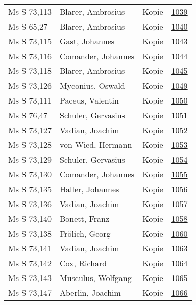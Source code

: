 \documentclass[10pt,a4paper,landscape]{report}
\begin{document}
\begin{longtable}{p{16cm}p{4cm}lr}
Ms S 73,113	&	Blarer, Ambrosius	&	Kopie	&	\href{http://130.60.24.72/assignment/1039}{1039}\\
Ms S 65,27	&	Blarer, Ambrosius	&	Kopie	&	\href{http://130.60.24.72/assignment/1040}{1040}\\
Ms S 73,115	&	Gast, Johannes	&	Kopie	&	\href{http://130.60.24.72/assignment/1043}{1043}\\
Ms S 73,116	&	Comander, Johannes	&	Kopie	&	\href{http://130.60.24.72/assignment/1044}{1044}\\
Ms S 73,118	&	Blarer, Ambrosius	&	Kopie	&	\href{http://130.60.24.72/assignment/1045}{1045}\\
Ms S 73,126	&	Myconius, Oswald	&	Kopie	&	\href{http://130.60.24.72/assignment/1049}{1049}\\
Ms S 73,111	&	Paceus, Valentin	&	Kopie	&	\href{http://130.60.24.72/assignment/1050}{1050}\\
Ms S 76,47	&	Schuler, Gervasius	&	Kopie	&	\href{http://130.60.24.72/assignment/1051}{1051}\\
Ms S 73,127	&	Vadian, Joachim	&	Kopie	&	\href{http://130.60.24.72/assignment/1052}{1052}\\
Ms S 73,128	&	von Wied, Hermann	&	Kopie	&	\href{http://130.60.24.72/assignment/1053}{1053}\\
Ms S 73,129	&	Schuler, Gervasius	&	Kopie	&	\href{http://130.60.24.72/assignment/1054}{1054}\\
Ms S 73,130	&	Comander, Johannes	&	Kopie	&	\href{http://130.60.24.72/assignment/1055}{1055}\\
Ms S 73,135	&	Haller, Johannes	&	Kopie	&	\href{http://130.60.24.72/assignment/1056}{1056}\\
Ms S 73,136	&	Vadian, Joachim	&	Kopie	&	\href{http://130.60.24.72/assignment/1057}{1057}\\
Ms S 73,140	&	Bonett, Franz	&	Kopie	&	\href{http://130.60.24.72/assignment/1058}{1058}\\
Ms S 73,138	&	Frölich, Georg	&	Kopie	&	\href{http://130.60.24.72/assignment/1060}{1060}\\
Ms S 73,141	&	Vadian, Joachim	&	Kopie	&	\href{http://130.60.24.72/assignment/1063}{1063}\\
Ms S 73,142	&	Cox, Richard	&	Kopie	&	\href{http://130.60.24.72/assignment/1064}{1064}\\
Ms S 73,143	&	Musculus, Wolfgang	&	Kopie	&	\href{http://130.60.24.72/assignment/1065}{1065}\\
Ms S 73,147	&	Aberlin, Joachim	&	Kopie	&	\href{http://130.60.24.72/assignment/1066}{1066}\\

\end{longtable}
\end{document}
